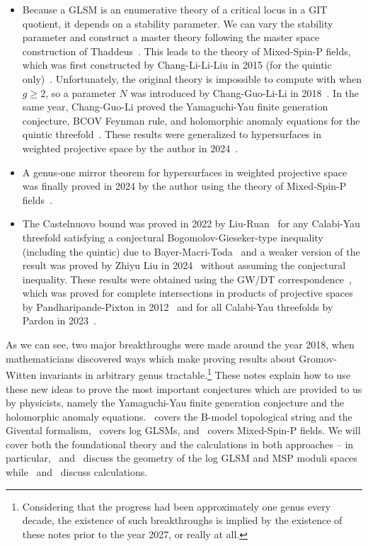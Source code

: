 \documentclass[10pt]{amsart}
\theoremstyle{definition}
\theoremstyle{remark}
\theoremstyle{plain}
\theoremstyle{definition}
\theoremstyle{remark}
\newcommand{\1}{\mathbf{1}}
\newcommand{\2}{\mathbf{2}}
\newcommand{\3}{\mathbf{3}}
\begin{document}
\begin{itemize}
    \item Because a GLSM is an enumerative theory of a critical locus in a GIT quotient, it depends on a stability parameter. We can vary the stability parameter and construct a master theory following the master space construction of Thaddeus~\cite{gitflips}. This leads to the theory of Mixed-Spin-P fields, which was first constructed by Chang-Li-Li-Liu in 2015 (for the quintic only)~\cite{mspfermat,msp2}. Unfortunately, the original theory is impossible to compute with when $g \geq 2$, so a parameter $N$ was introduced by Chang-Guo-Li-Li in 2018~\cite{nmsp}. In the same year, Chang-Guo-Li proved the Yamaguchi-Yau finite generation conjecture, BCOV Feynman rule, and holomorphic anomaly equations for the quintic threefold~\cite{nmsp2,nmsp3}. These results were generalized to hypersurfaces in weighted projective space by the author in 2024~\cite{polynomiality,bcovme}.
    \item A genus-one mirror theorem for hypersurfaces in weighted projective space was finally proved in 2024 by the author using the theory of Mixed-Spin-P fields~\cite{polynomiality}.
    \item The Castelnuovo bound was proved in 2022 by Liu-Ruan~\cite{castelnuovoquintic} for any Calabi-Yau threefold satisfying a conjectural Bogomolov-Gieseker-type inequality (including the quintic) due to Bayer-Macri-Toda~\cite{bmt} and a weaker version of the result was proved by Zhiyu Liu in 2024~\cite{castelnuovogeneral} without assuming the conjectural inequality. These results were obtained using the GW/DT correspondence~\cite{mnop1,mnop2}, which was proved for complete intersections in products of projective spaces by Pandharipande-Pixton in 2012~\cite{ppquintic} and for all Calabi-Yau threefolds by Pardon in 2023~\cite{universalcount}.
\end{itemize}

As we can see, two major breakthroughs were made around the year 2018, when mathematicians discovered ways which make proving results about Gromov-Witten invariants in arbitrary genus tractable.\footnote{Considering that the progress had been approximately one genus every decade, the existence of such breakthroughs is implied by the existence of these notes prior to the year 2027, or really at all.} These notes explain how to use these new ideas to prove the most important conjectures which are provided to us by physicists, namely the Yamaguchi-Yau finite generation conjecture and the holomorphic anomaly equations.~ covers the B-model topological string and the Givental formalism,~ covers log GLSMs, and~ covers Mixed-Spin-P fields. We will cover both the foundational theory and the calculations in both approaches -- in particular,~ and~ discuss the geometry of the log GLSM and MSP moduli spaces while~ and~ discuss calculations. 
\end{document}

